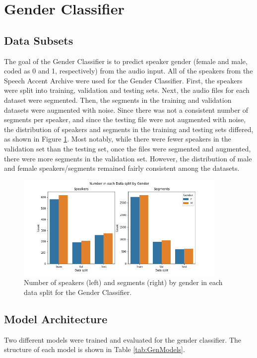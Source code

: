 \section{Gender Classifier}
\subsection{Data Subsets}

The goal of the Gender Classifier is to predict speaker gender (female and male, coded as 0 and 1, respectively) from the audio input. All of the speakers from the Speech Accent Archive were used for the Gender Classifier. First, the speakers were split into training, validation and testing sets.  Next, the audio files for each dataset were segmented. Then, the segments in the training and validation datasets were augmented with noise. Since there was not a  consistent number of segments per speaker, and since the testing file were not augmented with noise, the distribution of speakers and segments in the training and testing sets differed, as shown in Figure \ref{fig:GenderDist}. Most notably, while there were fewer speakers in the validation set than the testing set, once the files were segmented and augmented, there were more segments in the validation set. However, the distribution of male and female speakers/segments remained fairly consistent among the datasets.

\begin{figure}[h]
\begin{center}
\includegraphics[width=4in]{Gen_NSegSpeakSplit.png}
\caption{Number of speakers (left) and segments (right) by gender in each data split for the Gender Classifier.}
\label{fig:GenderDist}
\end{center}
\end{figure}

\subsection{Model Architecture}
Two different models were trained and evaluated for the gender classifier. The structure of each model is shown in Table \ref{tab:GenModels}. 

